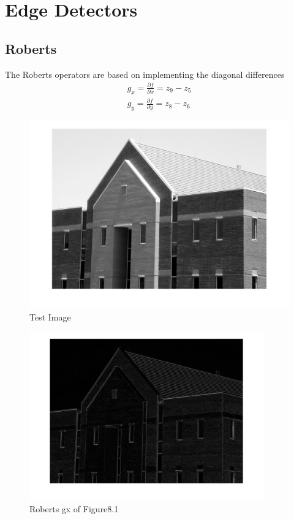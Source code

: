 \documentclass[11pt,oneside]{book}
\begin{document}
\section{Edge Detectors}
\subsection{Roberts}
The Roberts operators are based on implementing the diagonal differences
\begin{align}
g_x = \frac{\partial f}{\partial x} = z_9-z_5\\
g_y = \frac{\partial f}{\partial y} = z_8-z_6
\end{align}
\begin{figure}[!htb]
   \centering  
   \includegraphics[width=1\textwidth]{images/9/image.jpg}
   \caption{Test Image}
\end{figure}
\newpage
\begin{figure}[!htb]
   \centering  
   \includegraphics[width=0.9\textwidth]{images/9/roberts_x.jpg}
   \caption{Roberts gx of Figure8.1}
\end{figure}
\end{document}
